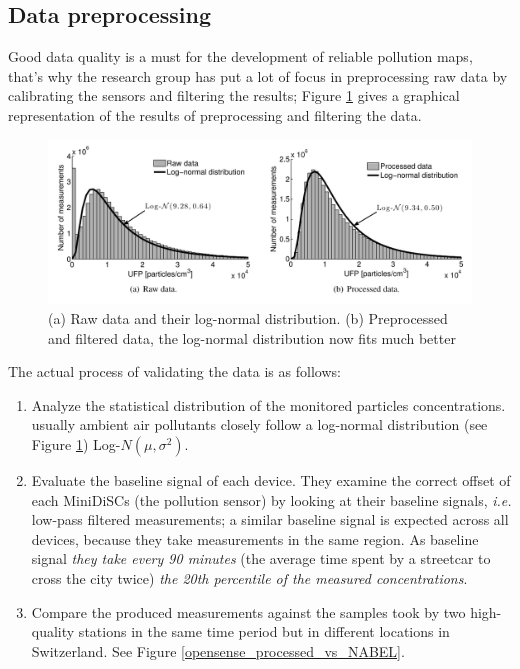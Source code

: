 \documentclass[11pt,a4paper,titlepage]{book}
\begin{document}
\subsection{Data preprocessing}
\label{opensense:preprocessing}
Good data quality is a must for the development of reliable pollution maps, that's why the research group has put a lot of focus in preprocessing raw data by calibrating the sensors and filtering the results; Figure \ref{opensense_data_filtering} gives a graphical representation of the results of preprocessing and filtering the data.
\begin{figure}[ht]
    \centering
    \includegraphics[width=\textwidth]{imgs/ch_2/OpenSense_data_filtering.png}
    \caption{(a) Raw data and their log-normal distribution. (b) Preprocessed and filtered data, the log-normal distribution now fits much better}
    \label{opensense_data_filtering}
\end{figure}
\newline
\newline
The actual process of validating the data is as follows:
\begin{enumerate}
    \item Analyze the statistical distribution of the monitored particles concentrations. usually ambient air pollutants closely follow a log-normal distribution (see Figure \ref{opensense_data_filtering}) Log-$N (\mu, \sigma^2)$.
    \item Evaluate the baseline signal of each device. They examine the correct offset of each MiniDiSCs (the pollution sensor) by looking at their baseline signals, \textit{i.e.} low-pass filtered measurements; a similar baseline signal is expected across all devices, because they take measurements in the same region. As baseline signal \textit{they take every 90 minutes} (the average time spent by a streetcar to cross the city twice) \textit{the 20th percentile of the measured concentrations}.
    \item Compare the produced measurements against the samples took by two high-quality stations in the same time period but in different locations in Switzerland. See Figure \ref{opensense_processed_vs_NABEL}.
\end{enumerate}
\end{document}
